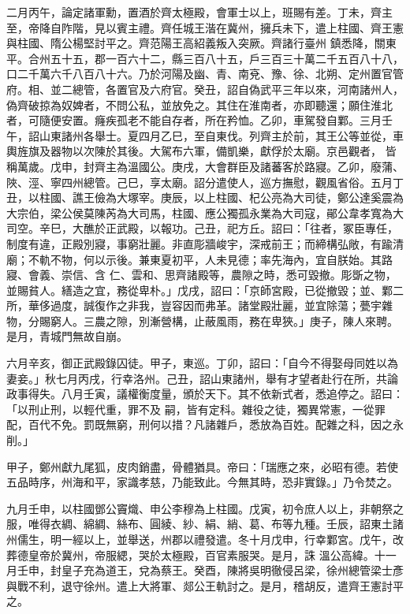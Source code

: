 \begin{pinyinscope}
 二月丙午，論定諸軍勳，置酒於齊太極殿，會軍士以上，班賜有差。丁未，齊主至，帝降自阼階，見以賓主禮。齊任城王湝在冀州，擁兵未下，遣上柱國、齊王憲與柱國、隋公楊堅討平之。齊范陽王高紹義叛入突厥。齊諸行臺州
 鎮悉降，關東平。合州五十五，郡一百六十二，縣三百八十五，戶三百三十萬二千五百八十八，口二千萬六千八百八十六。乃於河陽及幽、青、南兗、豫、徐、北朔、定州置官管府。相、並二總管，各置官及六府官。癸丑，詔自偽武平三年以來，河南諸州人，偽齊破掠為奴婢者，不問公私，並放免之。其住在淮南者，亦即聽還；願住淮北者，可隨便安置。癃疾孤老不能自存者，所在矜恤。乙卯，車駕發自鄴。三月壬午，詔山東諸州各舉士。夏四月乙巳，至自東伐。列齊主於前，其王公等並從，車輿旌旗及器物以次陳於其後。大駕布六軍，備凱樂，獻俘於太廟。京邑觀者，
 皆稱萬歲。戊申，封齊主為溫國公。庚戌，大會群臣及諸蕃客於路寢。乙卯，廢蒲、陜、涇、寧四州總管。己巳，享太廟。詔分遣使人，巡方撫慰，觀風省俗。五月丁丑，以柱國、譙王儉為大塚宰。庚辰，以上柱國、杞公亮為大司徒，鄭公達奚震為大宗伯，梁公侯莫陳芮為大司馬，柱國、應公獨孤永業為大司寇，鄖公韋孝寬為大司空。辛巳，大醮於正武殿，以報功。己丑，祀方丘。詔曰：「往者，冢臣專任，制度有違，正殿別寢，事窮壯麗。非直彫牆峻宇，深戒前王；而締構弘敞，有踰清廟；不軌不物，何以示後。兼東夏初平，人未見德；率先海內，宜自朕始。其路寢、會義、崇信、含
 仁、雲和、思齊諸殿等，農隙之時，悉可毀撤。彫斲之物，並賜貧人。繕造之宜，務從卑朴。」戊戌，詔曰：「京師宮殿，已從撤毀；並、鄴二所，華侈過度，誠復作之非我，豈容因而弗革。諸堂殿壯麗，並宜除蕩；甍宇雜物，分賜窮人。三農之隙，別漸營構，止蔽風雨，務在卑狹。」庚子，陳人來聘。是月，青城門無故自崩。



 六月辛亥，御正武殿錄囚徒。甲子，東巡。丁卯，詔曰：「自今不得娶母同姓以為妻妾。」秋七月丙戌，行幸洛州。己丑，詔山東諸州，舉有才望者赴行在所，共論政事得失。八月壬寅，議權衡度量，頒於天下。其不依新式者，悉追停之。詔曰：「以刑止刑，以輕代重，罪不及
 嗣，皆有定科。雜役之徒，獨異常憲，一從罪配，百代不免。罰既無窮，刑何以措？凡諸雜戶，悉放為百姓。配雜之科，因之永削。」



 甲子，鄭州獻九尾狐，皮肉銷盡，骨體猶具。帝曰：「瑞應之來，必昭有德。若使五品時序，州海和平，家識孝慈，乃能致此。今無其時，恐非實錄。」乃令焚之。



 九月壬申，以柱國鄧公竇熾、申公李穆為上柱國。戊寅，初令庶人以上，非朝祭之服，唯得衣綢、綿綢、絲布、圓綾、紗、絹、綃、葛、布等九種。壬辰，詔東土諸州儒生，明一經以上，並舉送，州郡以禮發遣。冬十月戊申，行幸鄴宮。戊午，改葬德皇帝於冀州，帝服緦，哭於太極殿，百官素服哭。是月，誅
 溫公高緯。十一月壬申，封皇子充為道王，兌為蔡王。癸酉，陳將吳明徹侵呂梁，徐州總管梁士彥與戰不利，退守徐州。遣上大將軍、郯公王軌討之。是月，稽胡反，遣齊王憲討平之。




\end{pinyinscope}
